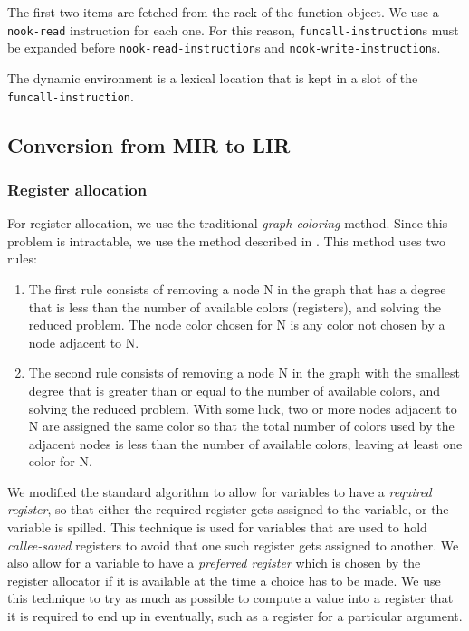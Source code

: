 The first two items are fetched from the rack of the function object.
We use a \texttt{nook-read} instruction for each one.  For this
reason, \texttt{funcall-instruction}s must be expanded before
\texttt{nook-read-instruction}s and \texttt{nook-write-instruction}s.

The dynamic environment is a lexical location that is kept in a slot
of the \texttt{funcall-instruction}.

\subsection{Conversion from MIR to LIR}

\subsubsection{Register allocation}

For register allocation, we use the traditional \emph{graph coloring}
method.  Since this problem is intractable, we use the method
described in \cite{Muchnick:1998:ACD:286076}.  This method uses two
rules:

\begin{enumerate}
\item The first rule consists of removing a node N in the graph that
  has a degree that is less than the number of available colors
  (registers), and solving the reduced problem.  The node color chosen
  for N is any color not chosen by a node adjacent to N.
\item The second rule consists of removing a node N in the graph with
  the smallest degree that is greater than or equal to the number of
  available colors, and solving the reduced problem.  With some luck,
  two or more nodes adjacent to N are assigned the same color so that
  the total number of colors used by the adjacent nodes is less than
  the number of available colors, leaving at least one color for N.
\end{enumerate}

We modified the standard algorithm to allow for variables to have a
\emph{required register}, so that either the required register gets
assigned to the variable, or the variable is spilled.  This technique
is used for variables that are used to hold \emph{callee-saved}
registers to avoid that one such register gets assigned to another.
We also allow for a variable to have a \emph{preferred register} which
is chosen by the register allocator if it is available at the time a
choice has to be made.  We use this technique to try as much as
possible to compute a value into a register that it is required to end
up in eventually, such as a register for a particular argument.%

